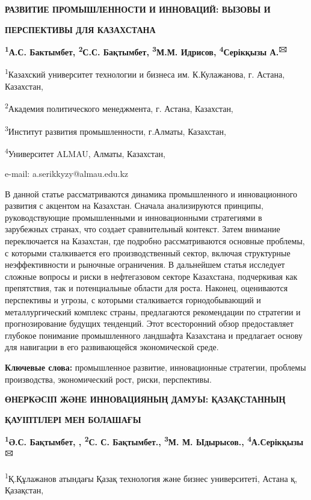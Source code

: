 {\bfseries РАЗВИТИЕ ПРОМЫШЛЕННОСТИ И ИННОВАЦИЙ: ВЫЗОВЫ И}

{\bfseries ПЕРСПЕКТИВЫ ДЛЯ КАЗАХСТАНА}

{\bfseries \textsuperscript{1}А.С. Бактымбет, \textsuperscript{2}С.С.
Бақтымбет, \textsuperscript{3}М.М. Идрисов, \textsuperscript{4}Серікқызы
А.\textsuperscript{🖂}}

\textsuperscript{1}Казахский университет технологии и бизнеса им.
К.Кулажанова, г. Астана, Казахстан,

\textsuperscript{2}Академия политического менеджмента, г. Астана,
Казахстан,

\textsuperscript{3}Институт развития промышленности, г.Алматы,
Казахстан,

\textsuperscript{4}Университет ALMAU, Алматы, Казахстан,

e-mail: a.serikkyzy@almau.edu.kz

В данной статье рассматриваются динамика промышленного и инновационного
развития с акцентом на Казахстан. Сначала анализируются принципы,
руководствующие промышленными и инновационными стратегиями в зарубежных
странах, что создает сравнительный контекст. Затем внимание
переключается на Казахстан, где подробно рассматриваются основные
проблемы, с которыми сталкивается его производственный сектор, включая
структурные неэффективности и рыночные ограничения. В дальнейшем статья
исследует сложные вопросы и риски в нефтегазовом секторе Казахстана,
подчеркивая как препятствия, так и потенциальные области для роста.
Наконец, оцениваются перспективы и угрозы, с которыми сталкивается
горнодобывающий и металлургический комплекс страны, предлагаются
рекомендации по стратегии и прогнозирование будущих тенденций. Этот
всесторонний обзор предоставляет глубокое понимание промышленного
ландшафта Казахстана и предлагает основу для навигации в его
развивающейся экономической среде.

{\bfseries Ключевые слова:} промышленное развитие, инновационные стратегии,
проблемы производства, экономический рост, риски, перспективы.

{\bfseries ӨНЕРКӘСІП ЖӘНЕ ИННОВАЦИЯНЫҢ ДАМУЫ: ҚАЗАҚСТАННЫҢ}

{\bfseries ҚАУІПТІЛЕРІ МЕН БОЛАШАҒЫ}

{\bfseries \textsuperscript{1}Ә.С. Бақтымбет, , \textsuperscript{2}С. С.
Бақтымбет., \textsuperscript{3}М. М. Ыдырысов.,
\textsuperscript{4}А.Серікқызы\textsuperscript{🖂}}

\textsuperscript{1}Қ.Құлажанов атындағы Қазақ технология және бизнес
университеті, Астана қ, Қазақстан,

